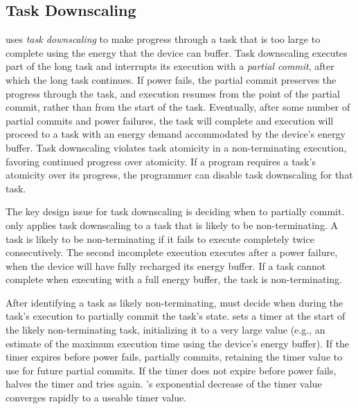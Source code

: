 \subsection{Task Downscaling}
\label{sec:task_downsizing}

\sys uses {\em task downscaling} to make progress through a task that is too
large to complete using the energy that the device can buffer.  Task
downscaling executes part of the long task and interrupts its execution with a
{\em partial commit}, after which the long task continues. If power fails, the
partial commit preserves the progress through the task, and execution resumes
from the point of the partial commit, rather than from the start of the task.
Eventually, after some number of partial commits and power failures, the task
will complete and execution will proceed to a task with an energy demand
accommodated by the device's energy buffer. Task downscaling violates task
atomicity in a non-terminating execution, favoring continued progress over
atomicity. If a program requires a task's atomicity over its progress, 
the programmer can disable task downscaling for that task.

The key design issue for task downscaling is deciding when to partially commit.
\sys only applies task downscaling to a task that is likely to be
non-terminating.  A task is likely to be non-terminating if it fails to execute
completely twice consecutively. The second incomplete execution executes after
a power failure, when the device will have fully recharged its energy buffer.
If a task cannot complete when executing with a full energy buffer, the task is
non-terminating.

After identifying a task as likely non-terminating, \sys must decide when
during the task's execution to partially commit the task's state.
%
\sys sets a timer at the start of the likely non-terminating task, initializing
it to a very large value (e.g., an estimate of the maximum execution time using
the device's energy buffer).
%
If the timer expires before power fails, \sys partially commits, retaining 
the timer value to use for future partial commits. 
%
If the timer does not expire before power fails, \sys halves the timer and
tries again.
%
\sys's exponential decrease of the timer value converges rapidly to a useable
timer value.


